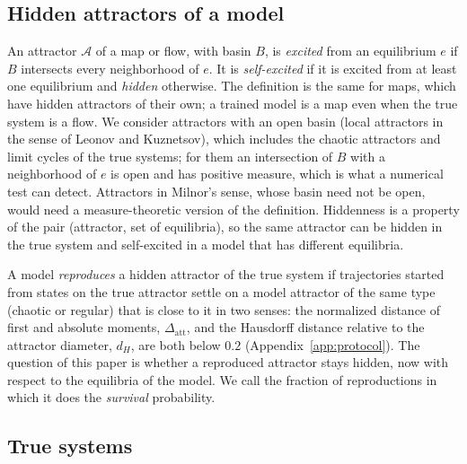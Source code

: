 \documentclass[aip,cha,reprint,amsmath,amssymb,longbibliography]{revtex4-2}
\theoremstyle{definition}
\begin{document}
\subsection{Hidden attractors of a model}
\label{sec:hidden}

An attractor $\mathcal{A}$ of a map or flow, with basin $B$, is \emph{excited} from an equilibrium $e$ if $B$ intersects
every neighborhood of $e$. It is \emph{self-excited} if it is excited from at least one equilibrium and \emph{hidden}
otherwise.\cite{LeonovKuznetsov2013,Dudkowski2016} The definition is the same for maps, which have hidden attractors of
their own;\cite{Jiang2016Maps} a trained model is a map even when the true system is a flow. We consider attractors with an open basin (local attractors
in the sense of Leonov and Kuznetsov), which includes the chaotic attractors and limit cycles of the true systems; for them
an intersection of $B$ with a neighborhood of $e$ is open and has positive measure, which is what a numerical test can
detect. Attractors in Milnor's sense,\cite{Milnor1985Attractor} whose basin need not be open, would need a measure-theoretic
version of the definition. Hiddenness is a property of the pair
(attractor, set of equilibria), so the same attractor can be hidden in the true system and self-excited in a model that
has different equilibria.

A model \emph{reproduces} a hidden attractor of the true system if trajectories started from states on the true attractor
settle on a model attractor of the same type (chaotic or regular) that is close to it in two senses: the normalized
distance of first and absolute moments, $\Delta_{\mathrm{att}}$, and the Hausdorff distance relative to the attractor
diameter, $d_H$, are both below $0.2$ (Appendix~\ref{app:protocol}). The question of this paper is whether a reproduced
attractor stays hidden, now with respect to the equilibria of the model. We call the fraction of reproductions in which it
does the \emph{survival} probability.

\subsection{True systems}
\label{sec:systems}
\end{document}

